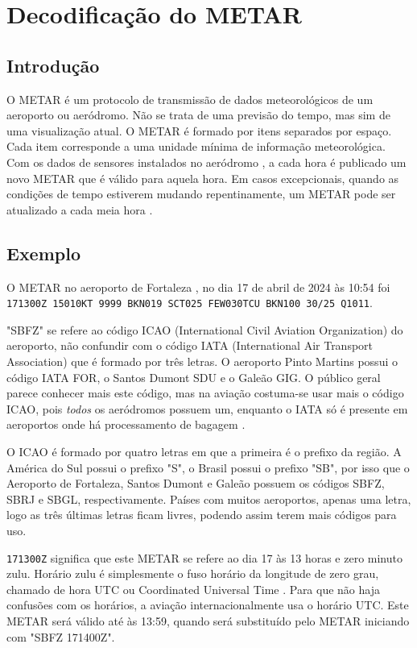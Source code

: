 \chapter{Decodificação do METAR}

\section{Introdução}
O METAR é um protocolo de transmissão de dados meteorológicos de um aeroporto ou aeródromo. Não se trata de 
uma previsão do tempo, mas sim de uma visualização atual. O METAR é formado por itens separados por espaço. 
Cada item corresponde a uma unidade mínima de informação meteorológica. Com os dados de sensores instalados 
no aeródromo \cite{metar-weather-gov}, a cada hora é publicado um novo METAR que é válido para aquela hora. 
Em casos excepcionais, quando as condições de tempo estiverem mudando repentinamente, um METAR pode ser atualizado 
a cada meia hora \cite{METAR-speci}.

\section{Exemplo}
O METAR no aeroporto de Fortaleza \cite{METAR-sbfz}, no dia 17 de abril de 2024 às 10:54 foi
\texttt{171300Z 15010KT 9999 BKN019 SCT025 FEW030TCU BKN100 30/25 Q1011}.

"SBFZ" se refere ao código ICAO (International Civil Aviation Organization) do aeroporto, não confundir 
com o código IATA (International Air Transport Association) que é formado por três letras. O aeroporto Pinto 
Martins possui o código IATA FOR, o Santos Dumont SDU e o Galeão GIG. O público geral parece conhecer mais este 
código, mas na aviação costuma-se usar mais o código ICAO, pois \textit{todos} os aeródromos possuem um, 
enquanto o IATA só é presente em aeroportos onde há processamento de bagagem \cite{iata-codes} \cite{icao-codes}.

O ICAO é formado por quatro letras em que a primeira é o prefixo da região. A América do Sul possui o prefixo "S", 
o Brasil possui o prefixo "SB", por isso que o Aeroporto de Fortaleza, Santos Dumont e Galeão possuem os códigos 
SBFZ, SBRJ e SBGL, respectivamente. Países com muitos aeroportos, apenas uma letra, 
logo as três últimas letras ficam livres, podendo assim terem mais códigos para uso.

\texttt{171300Z} significa que este METAR se refere ao dia 17 às 13 horas e zero minuto zulu. Horário zulu é 
simplesmente o fuso horário da longitude de zero grau, chamado de hora UTC ou Coordinated Universal Time \cite{UTC}. 
Para que não haja confusões com os horários, a aviação internacionalmente usa o horário UTC. Este METAR será 
válido até às 13:59, quando será substituído pelo METAR iniciando com "SBFZ 171400Z".

